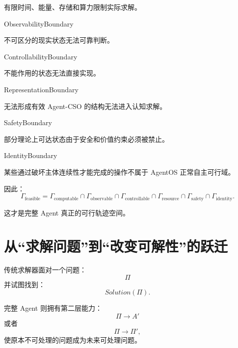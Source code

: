 有限时间、能量、存储和算力限制实际求解。

\begin{statementbox}
ObservabilityBoundary
\end{statementbox}

不可区分的现实状态无法可靠判断。

\begin{statementbox}
ControllabilityBoundary
\end{statementbox}

不能作用的状态无法直接实现。

\begin{statementbox}
RepresentationBoundary
\end{statementbox}

无法形成有效 Agent-CSO 的结构无法进入认知求解。

\begin{statementbox}
SafetyBoundary
\end{statementbox}

部分理论上可达状态由于安全和价值约束必须被禁止。

\begin{statementbox}
IdentityBoundary
\end{statementbox}

某些通过破坏主体连续性才能完成的操作不属于 AgentOS 正常自主可行域。

因此：
\begin{equation}
\Gamma_{\mathrm{feasible}}
=
\Gamma_{\mathrm{computable}}
\cap
\Gamma_{\mathrm{observable}}
\cap
\Gamma_{\mathrm{controllable}}
\cap
\Gamma_{\mathrm{resource}}
\cap
\Gamma_{\mathrm{safety}}
\cap
\Gamma_{\mathrm{identity}}.
\end{equation}

这才是完整 Agent 真正的可行轨迹空间。

\section{从“求解问题”到“改变可解性”的跃迁}

传统求解器面对一个问题：
\begin{equation}
\Pi
\end{equation}
并试图找到：
\begin{equation}
Solution(\Pi).
\end{equation}

完整 Agent 则拥有第二层能力：
\begin{equation}
\Pi
\rightarrow
A'
\end{equation}
或者
\begin{equation}
\Pi
\rightarrow
\Pi',
\end{equation}
使原本不可处理的问题成为未来可处理问题。

